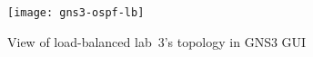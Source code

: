 \begin{figure}
  \centering
  \texttt{[image: gns3-ospf-lb]}
  \caption{View of load-balanced lab~3's topology in GNS3 GUI}
  \label{fig:gns3-ospf-lb}
\end{figure}
